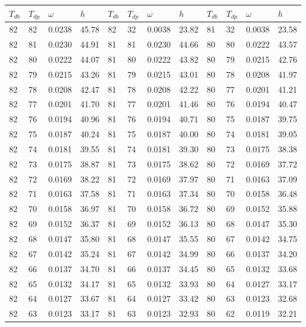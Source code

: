 \begin{tabular}{llll|llll|llll}
 \toprule 
\(T_{db}\) & \(T_{dp}\) & \(\omega\) & \(h\) & \(T_{db}\) & \(T_{dp}\) & \(\omega\) & \(h\) & \(T_{db}\) & \(T_{dp}\) & \(\omega\) & \(h\)  \\ \midrule 
82 & 82 & 0.0238 & 45.78 & 82 & 32 & 0.0038 & 23.82 & 81 & 32 & 0.0038 & 23.58\\
82 & 81 & 0.0230 & 44.91 & 81 & 81 & 0.0230 & 44.66 & 80 & 80 & 0.0222 & 43.57\\
82 & 80 & 0.0222 & 44.07 & 81 & 80 & 0.0222 & 43.82 & 80 & 79 & 0.0215 & 42.76\\
82 & 79 & 0.0215 & 43.26 & 81 & 79 & 0.0215 & 43.01 & 80 & 78 & 0.0208 & 41.97\\
82 & 78 & 0.0208 & 42.47 & 81 & 78 & 0.0208 & 42.22 & 80 & 77 & 0.0201 & 41.21\\
82 & 77 & 0.0201 & 41.70 & 81 & 77 & 0.0201 & 41.46 & 80 & 76 & 0.0194 & 40.47\\
82 & 76 & 0.0194 & 40.96 & 81 & 76 & 0.0194 & 40.71 & 80 & 75 & 0.0187 & 39.75\\
82 & 75 & 0.0187 & 40.24 & 81 & 75 & 0.0187 & 40.00 & 80 & 74 & 0.0181 & 39.05\\
82 & 74 & 0.0181 & 39.55 & 81 & 74 & 0.0181 & 39.30 & 80 & 73 & 0.0175 & 38.38\\
82 & 73 & 0.0175 & 38.87 & 81 & 73 & 0.0175 & 38.62 & 80 & 72 & 0.0169 & 37.72\\
82 & 72 & 0.0169 & 38.22 & 81 & 72 & 0.0169 & 37.97 & 80 & 71 & 0.0163 & 37.09\\
82 & 71 & 0.0163 & 37.58 & 81 & 71 & 0.0163 & 37.34 & 80 & 70 & 0.0158 & 36.48\\
82 & 70 & 0.0158 & 36.97 & 81 & 70 & 0.0158 & 36.72 & 80 & 69 & 0.0152 & 35.88\\
82 & 69 & 0.0152 & 36.37 & 81 & 69 & 0.0152 & 36.13 & 80 & 68 & 0.0147 & 35.30\\
82 & 68 & 0.0147 & 35.80 & 81 & 68 & 0.0147 & 35.55 & 80 & 67 & 0.0142 & 34.75\\
82 & 67 & 0.0142 & 35.24 & 81 & 67 & 0.0142 & 34.99 & 80 & 66 & 0.0137 & 34.20\\
82 & 66 & 0.0137 & 34.70 & 81 & 66 & 0.0137 & 34.45 & 80 & 65 & 0.0132 & 33.68\\
82 & 65 & 0.0132 & 34.17 & 81 & 65 & 0.0132 & 33.93 & 80 & 64 & 0.0127 & 33.17\\
82 & 64 & 0.0127 & 33.67 & 81 & 64 & 0.0127 & 33.42 & 80 & 63 & 0.0123 & 32.68\\
82 & 63 & 0.0123 & 33.17 & 81 & 63 & 0.0123 & 32.93 & 80 & 62 & 0.0119 & 32.21\\

\end{tabular}
